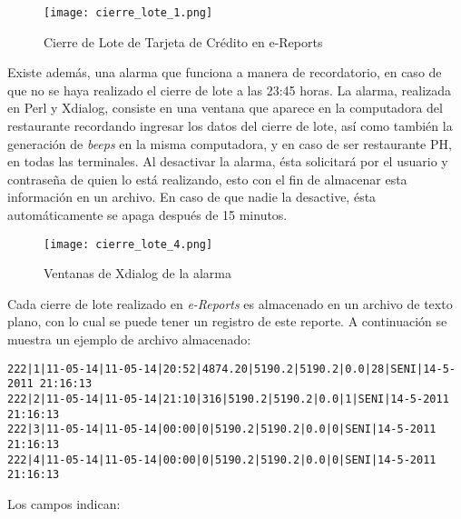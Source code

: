 \begin{figure}[htb]
 \begin{center}
  \texttt{[image: cierre\_lote\_1.png]}
 \end{center}
 \caption{Cierre de Lote de Tarjeta de Crédito en e-Reports}
 \label{fig:cierre_lote_1}
\end{figure}

Existe además, una alarma que funciona a manera de recordatorio, en caso de que no se haya realizado el cierre de lote a las 23:45 horas. La alarma, realizada en Perl y Xdialog, consiste en una ventana que aparece en la computadora del restaurante recordando ingresar los datos del cierre de lote, así como también la generación de \textit{beeps} en la misma computadora, y en caso de ser restaurante PH, en todas las terminales. Al desactivar la alarma, ésta solicitará por el usuario y contraseña de quien lo está realizando, esto con el fin de almacenar esta información en un archivo. En caso de que nadie la desactive, ésta automáticamente se apaga después de 15 minutos.

\begin{figure}[htb]
 \begin{center}
  \texttt{[image: cierre\_lote\_4.png]}
 \end{center}
 \caption{Ventanas de Xdialog de la alarma}
 \label{fig:cierre_lote_4}
\end{figure}

Cada cierre de lote realizado en \textit{e-Reports} es almacenado en un archivo de texto plano, con lo cual se puede tener un registro de este reporte. A continuación se muestra un ejemplo de archivo almacenado:

\begin{Verbatim}[fontsize=\small]
222|1|11-05-14|11-05-14|20:52|4874.20|5190.2|5190.2|0.0|28|SENI|14-5-2011 21:16:13
222|2|11-05-14|11-05-14|21:10|316|5190.2|5190.2|0.0|1|SENI|14-5-2011 21:16:13
222|3|11-05-14|11-05-14|00:00|0|5190.2|5190.2|0.0|0|SENI|14-5-2011 21:16:13
222|4|11-05-14|11-05-14|00:00|0|5190.2|5190.2|0.0|0|SENI|14-5-2011 21:16:13
\end{Verbatim}

Los campos indican:

